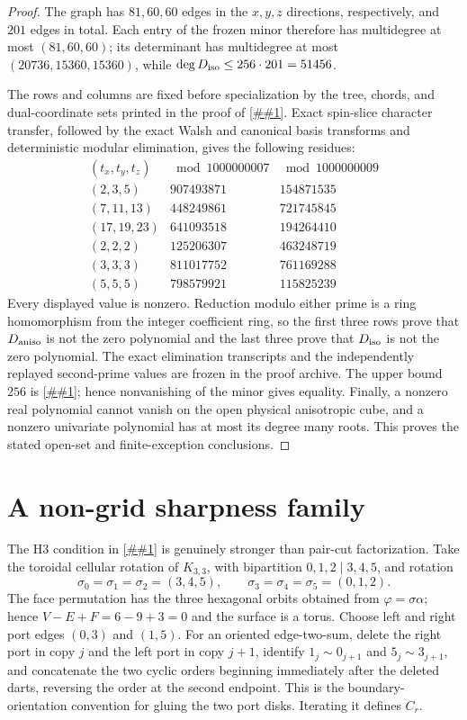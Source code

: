 \documentclass[11pt]{article}
\newcommand{\cref}[1]{\autoref{##1}}%
\begin{document}
\begin{proof}
The graph has \(81,60,60\) edges in the \(x,y,z\) directions, respectively,
and \(201\) edges in total.  Each entry of the frozen minor therefore has
multidegree at most \((81,60,60)\); its determinant has multidegree at most
\((20736,15360,15360)\), while \(\deg D_{\rm iso}\leq256\cdot201=51456\).

The rows and columns are fixed before specialization by the tree, chords, and
dual-coordinate sets printed in the proof of \cref{thm:grid-tight}.  Exact
spin-slice character transfer, followed by the exact Walsh and canonical
basis transforms and deterministic modular elimination, gives the following
residues:
\[
\begin{array}{c|rr}
(t_x,t_y,t_z)&\bmod 1000000007&\bmod 1000000009\\ \hline
(2,3,5)&907493871&154871535\\
(7,11,13)&448249861&721745845\\
(17,19,23)&641093518&194264410\\
(2,2,2)&125206307&463248719\\
(3,3,3)&811017752&761169288\\
(5,5,5)&798579921&115825239
\end{array}
\]
Every displayed value is nonzero.  Reduction modulo either prime is a ring
homomorphism from the integer coefficient ring, so the first three rows prove
that \(D_{\rm aniso}\) is not the zero polynomial and the last three prove
that \(D_{\rm iso}\) is not the zero polynomial.  The exact elimination
transcripts and the independently replayed second-prime values are frozen in
the proof archive.  The upper bound \(256\) is \cref{thm:grid-upper}; hence
nonvanishing of the minor gives equality.  Finally, a nonzero real polynomial
cannot vanish on the open physical anisotropic cube, and a nonzero univariate
polynomial has at most its degree many roots.  This proves the stated open-set
and finite-exception conclusions.
\end{proof}

\section{A non-grid sharpness family}

The H3 condition in \cref{thm:separator} is genuinely stronger than pair-cut
factorization.  Take the toroidal cellular rotation of \(K_{3,3}\), with
bipartition \(0,1,2\mid3,4,5\), and rotation
\[
 \sigma_0=\sigma_1=\sigma_2=(3,4,5),\qquad
 \sigma_3=\sigma_4=\sigma_5=(0,1,2).
\]
The face permutation has the three hexagonal orbits
obtained from \(\varphi=\sigma\alpha\); hence \(V-E+F=6-9+3=0\) and the
surface is a torus.  Choose left and right port edges \((0,3)\) and \((1,5)\).
For an oriented edge-two-sum, delete the right port in copy \(j\) and the
left port in copy \(j+1\), identify \(1_j\sim0_{j+1}\) and
\(5_j\sim3_{j+1}\), and concatenate the two cyclic orders beginning
immediately after the deleted darts, reversing the order at the second
endpoint.  This is the boundary-orientation convention for gluing the two
port disks.  Iterating it defines \(C_r\).
\end{document}
